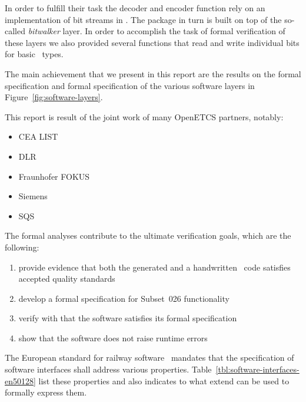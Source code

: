 \FloatBarrier

In order to fulfill their task the decoder and encoder function rely on an
implementation of bit streams in \isoc.
The  package in turn is built on top of the so-called \emph{bitwalker} layer.
In order to accomplish the task of formal verification of these layers 
we also provided several functions that read and write individual bits for basic \isoc~types.

The main achievement that we present in this report are the results
on the formal specification and formal specification of the various software layers 
in Figure~\ref{fig:software-layers}.

This report is result of the joint work of many OpenETCS partners, notably:

\begin{itemize}
\item CEA LIST
\item DLR
\item Fraunhofer FOKUS
\item Siemens
\item SQS
\end{itemize}

The formal analyses contribute to the ultimate verification goals,
which are the following:

\begin{enumerate}
\item provide evidence that both the generated and a handwritten \isoc~code satisfies 
      accepted quality standards
\item develop a formal specification for Subset~026 functionality
\item verify with \framacwp that the software satisfies its formal specification
\item show that the software does not raise runtime errors
\end{enumerate}

The European standard for railway software~\cite[\S~7.3.4.19]{en50128-2011} mandates that 
the specification of software interfaces shall address various properties.
Table~\ref{tbl:software-interfaces-en50128} list these properties and also indicates
to what extend \framac can be used to formally express them.



